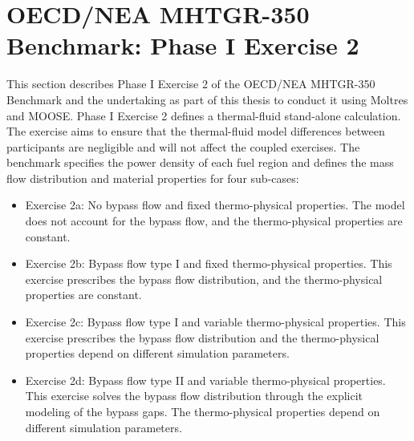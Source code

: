 

\section{OECD/NEA MHTGR-350 Benchmark: Phase I Exercise 2}
\label{sec:ph1ex2}

This section describes Phase I Exercise 2 of the OECD/NEA MHTGR-350 Benchmark \cite{oecd_nea_benchmark_2017} and the undertaking as part of this thesis to conduct it using Moltres and MOOSE.
Phase I Exercise 2 defines a thermal-fluid stand-alone calculation.
The exercise aims to ensure that the thermal-fluid model differences between participants are negligible and will not affect the coupled exercises.
The benchmark specifies the power density of each fuel region and defines the mass flow distribution and material properties for four sub-cases:
\begin{itemize}
  \item Exercise 2a: No bypass flow and fixed thermo-physical properties. The model does not account for the bypass flow, and the thermo-physical properties are constant.
  \item Exercise 2b: Bypass flow type I and fixed thermo-physical properties. This exercise prescribes the bypass flow distribution, and the thermo-physical properties are constant.
  \item Exercise 2c: Bypass flow type I and variable thermo-physical properties. This exercise prescribes the bypass flow distribution and the thermo-physical properties depend on different simulation parameters.
  \item Exercise 2d: Bypass flow type II and variable thermo-physical properties. This exercise solves the bypass flow distribution through the explicit modeling of the bypass gaps. The thermo-physical properties depend on different simulation parameters.
\end{itemize}

